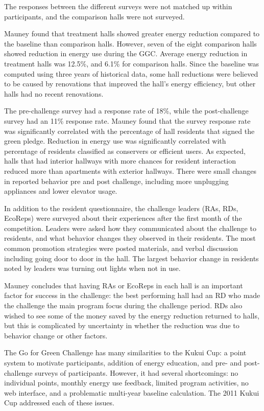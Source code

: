 The responses between the different surveys were not matched up within participants, and the comparison halls were not surveyed.

Mauney found that treatment halls showed greater energy reduction compared to the baseline than comparison halls. However, seven of the eight comparison halls showed reduction in energy use during the GGC. Average energy reduction in treatment halls was 12.5\%, and 6.1\% for comparison halls. Since the baseline was computed using three years of historical data, some hall reductions were believed to be caused by renovations that improved the hall's energy efficiency, but other halls had no recent renovations.

The pre-challenge survey had a response rate of 18\%, while the post-challenge survey had an 11\% response rate. Mauney found that the survey response rate was significantly correlated with the percentage of hall residents that signed the green pledge. Reduction in energy use was significantly correlated with percentage of residents classified as conservers or efficient users. As expected, halls that had interior hallways with more chances for resident interaction reduced more than apartments with exterior hallways. There were small changes in reported behavior pre and post challenge, including more unplugging appliances and lower elevator usage.

In addition to the resident questionnaire, the challenge leaders (RAs, RDs, EcoReps) were surveyed about their experiences after the first month of the competition. Leaders were asked how they communicated about the challenge to residents, and what behavior changes they observed in their residents. The most common promotion strategies were posted materials, and verbal discussion including going door to door in the hall. The largest behavior change in residents noted by leaders was turning out lights when not in use.

Mauney concludes that having RAs or EcoReps in each hall is an important factor for success in the challenge: the best performing hall had an RD who made the challenge the main program focus during the challenge period. RDs also wished to see some of the money saved by the energy reduction returned to halls, but this is complicated by uncertainty in whether the reduction was due to behavior change or other factors.

The Go for Green Challenge has many similarities to the Kukui Cup: a point system to motivate participants, addition of energy education, and pre- and post-challenge surveys of participants. However, it had several shortcomings: no individual points, monthly energy use feedback, limited program activities, no web interface, and a problematic multi-year baseline calculation. The 2011 Kukui Cup addressed each of these issues.


